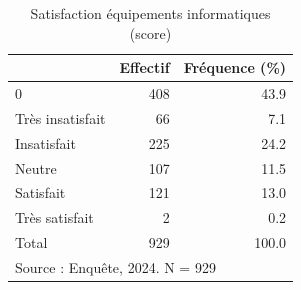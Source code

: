 \begin{table}[htbp]\centering
\def\sym#1{\ifmmode^{#1}\else\(^{#1}\)\fi}
\caption{Satisfaction équipements informatiques (score)}
\begin{tabular}{l*{2}{r}}
\toprule
            &    Effectif&Fréquence (\%)\\
\midrule
0           &         408&        43.9\\
Très insatisfait&          66&         7.1\\
Insatisfait &         225&        24.2\\
Neutre      &         107&        11.5\\
Satisfait   &         121&        13.0\\
Très satisfait&           2&         0.2\\
Total       &         929&       100.0\\
\bottomrule
\multicolumn{3}{l}{\footnotesize Source : Enquête, 2024. N = 929}\\
\end{tabular}
\end{table}
